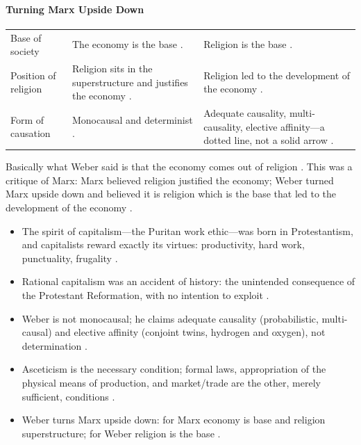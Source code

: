 \paragraph{Turning Marx Upside Down}
\vspace{6pt}
\noindent
\begin{tabularx}{\textwidth}{>{\hsize}Y >{\hsize}Y >{\hsize}Y}
\toprule
{}
 &  &  \\
\midrule
Base of society & The economy is the base . & Religion is the base . \\
\midrule
Position of religion & Religion sits in the superstructure and justifies the economy . & Religion led to the development of the economy . \\
\midrule
Form of causation & Monocausal and determinist . & Adequate causality, multi-causality, elective affinity---a dotted line, not a solid arrow . \\
\bottomrule
\end{tabularx}
\vspace{6pt}

Basically what Weber said is that the economy comes out of religion . This was a critique of Marx: Marx believed religion justified the economy; Weber turned Marx upside down and believed it is religion which is the base that led to the development of the economy .

\begin{QuickRevision}
\begin{itemize}
    \item The spirit of capitalism---the Puritan work ethic---was born in Protestantism, and capitalists reward exactly its virtues: productivity, hard work, punctuality, frugality .
    \item Rational capitalism was an accident of history: the unintended consequence of the Protestant Reformation, with no intention to exploit .
    \item Weber is not monocausal; he claims adequate causality (probabilistic, multi-causal) and elective affinity (conjoint twins, hydrogen and oxygen), not determination .
    \item Asceticism is the necessary condition; formal laws, appropriation of the physical means of production, and market/trade are the other, merely sufficient, conditions .
    \item Weber turns Marx upside down: for Marx economy is base and religion superstructure; for Weber religion is the base .
\end{itemize}
\end{QuickRevision}

